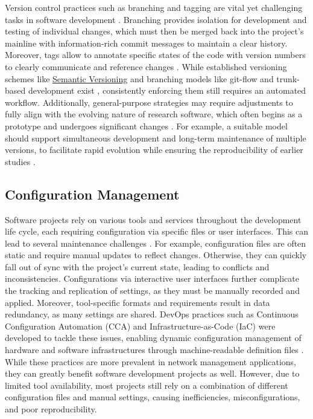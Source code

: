 \documentclass{article}
\begin{document}
Version control practices such as branching and tagging are vital yet challenging tasks in software development \cite{10MetricsForSciSoftware, ELIXIRSoftwareManagementPlan, EffectOfBranchingStrategies, BranchUseInPractice}. Branching provides isolation for development and testing of individual changes, which must then be merged back into the project's mainline with information-rich commit messages to maintain a clear history. Moreover, tags allow to annotate specific states of the code with version numbers to clearly communicate and reference changes \cite{ImportanceOfBranchingModels, CICDSystematicReview}. While established versioning schemes like \href{https://semver.org/}{Semantic Versioning} and branching models like git-flow and trunk-based development exist \cite{TrunkBasedDev, GitFlow, GitHubFlow, GitLabFlow}, consistently enforcing them still requires an automated workflow. Additionally, general-purpose strategies may require adjustments to fully align with the evolving nature of research software, which often begins as a prototype and undergoes significant changes \cite{UnderstandingHPCCommunity}. For example, a suitable model should support simultaneous development and long-term maintenance of multiple versions, to facilitate rapid evolution while ensuring the reproducibility of earlier studies \cite{ConfigManageForLargescaleSciComp}. 

\subsection{Configuration Management}

Software projects rely on various tools and services throughout the development life cycle, each requiring configuration via specific files or user interfaces. This can lead to several maintenance challenges \cite{BestPracticesForSciComp, DevOpsInSciSysDev}. For example, configuration files are often static and require manual updates to reflect changes. Otherwise, they can quickly fall out of sync with the project's current state, leading to conflicts and inconsistencies. Configurations via interactive user interfaces further complicate the tracking and replication of settings, as they must be manually recorded and applied. Moreover, tool-specific formats and requirements result in data redundancy, as many settings are shared. DevOps practices such as Continuous Configuration Automation (CCA) and Infrastructure-as-Code (IaC) were developed to tackle these issues, enabling dynamic configuration management of hardware and software infrastructures through machine-readable definition files \cite{InfrastructureAsCode}. While these practices are more prevalent in network management applications, they can greatly benefit software development projects as well. However, due to limited tool availability, most projects still rely on a combination of different configuration files and manual settings, causing inefficiencies, misconfigurations, and poor reproducibility.
\end{document}
